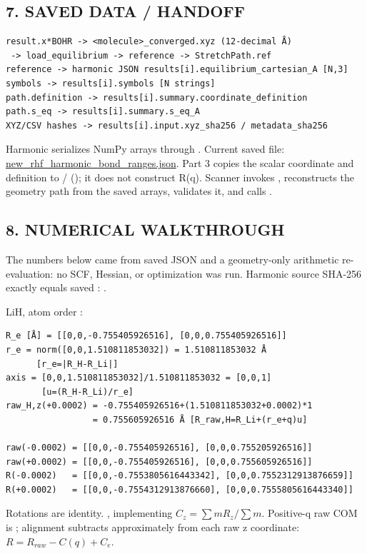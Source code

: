 \documentclass[10pt,a4paper]{article}
\begin{document}
\subsection{7. SAVED DATA / HANDOFF}
\begin{Verbatim}
result.x*BOHR -> <molecule>_converged.xyz (12-decimal Å)
 -> load_equilibrium -> reference -> StretchPath.ref
reference -> harmonic JSON results[i].equilibrium_cartesian_A [N,3]
symbols -> results[i].symbols [N strings]
path.definition -> results[i].summary.coordinate_definition
path.s_eq -> results[i].summary.s_eq_A
XYZ/CSV hashes -> results[i].input.xyz_sha256 / metadata_sha256
\end{Verbatim}
Harmonic  serializes NumPy arrays through . Current saved file: \href{/Users/novaz/Desktop/qml2.0/json/new\_rhf\_harmonic\_bond\_ranges.json}{new\_rhf\_harmonic\_bond\_ranges.json}. Part 3 copies the scalar coordinate and definition to / (); it does not construct R(q). Scanner  invokes  , reconstructs the geometry path from the saved arrays, validates it, and calls .

\subsection{8. NUMERICAL WALKTHROUGH}
The numbers below came from saved JSON and a geometry-only arithmetic re-evaluation: no SCF, Hessian, or optimization was run. Harmonic source SHA-256 exactly equals saved : .

LiH, atom order \code{[Li,H]}:

\begin{Verbatim}
R_e [Å] = [[0,0,-0.755405926516], [0,0,0.755405926516]]
r_e = norm([0,0,1.510811853032]) = 1.510811853032 Å
      [r_e=|R_H-R_Li|]
axis = [0,0,1.510811853032]/1.510811853032 = [0,0,1]
       [u=(R_H-R_Li)/r_e]
raw_H,z(+0.0002) = -0.755405926516+(1.510811853032+0.0002)*1
                 = 0.755605926516 Å [R_raw,H=R_Li+(r_e+q)u]

raw(-0.0002) = [[0,0,-0.755405926516], [0,0,0.755205926516]]
raw(+0.0002) = [[0,0,-0.755405926516], [0,0,0.755605926516]]
R(-0.0002)   = [[0,0,-0.7553805616443342], [0,0,0.7552312913876659]]
R(+0.0002)   = [[0,0,-0.7554312913876660], [0,0,0.7555805616443340]]
\end{Verbatim}
Rotations are identity. , implementing \(C_z=\sum mR_z/\sum m\). Positive-q raw COM is ; alignment subtracts approximately  from each raw z coordinate: \(R=R_{raw}-C(q)+C_e\).
\end{document}
